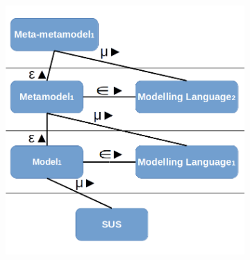 \documentclass[tuberlin,cic,tc,english,noabntcite]{iiufrgs}
\begin{document}
\begin{description}
	\begin{figure}[h]
		\caption{On the left is a depiction of the theoretical definitions of system, model, metamodel, meta-metamodel and modeling language. Like stated before, a system is represented by models, which themselves are expressed in languages and are conform to meta-models. A more concrete and practical illustration of the definitions is on the right. This example shows a scenario very close to the implementation made in chapter \ref{chapter:metamodel_relations}.}
		\centering
		\begin{subfigure}[h]{.49\textwidth}
		    \includegraphics[width=\textwidth]{model_scheme}
		\end{subfigure}
		\begin{subfigure}[h]{.49\textwidth}

\end{subfigure}
\end{figure}
\end{description}
\end{document}
